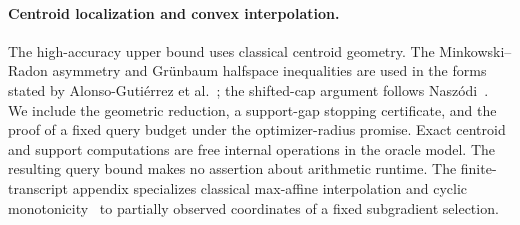 \documentclass[11pt]{article}
\numberwithin{equation}{section}
\theoremstyle{definition}
\theoremstyle{remark}
\begin{document}
\paragraph{Centroid localization and convex interpolation.}
The high-accuracy upper bound uses classical centroid geometry. The Minkowski--Radon asymmetry and Gr\"unbaum halfspace inequalities are used in the forms stated by Alonso-Guti\'errez et al.\ \cite{AGMSMGYN2024}; the shifted-cap argument follows Nasz\'odi\ \cite[Lemma~2.1]{Naszodi2017}. We include the geometric reduction, a support-gap stopping certificate, and the proof of a fixed query budget under the optimizer-radius promise. Exact centroid and support computations are free internal operations in the oracle model. The resulting query bound makes no assertion about arithmetic runtime. The finite-transcript appendix specializes classical max-affine interpolation and cyclic monotonicity\ \cite{Rockafellar1966} to partially observed coordinates of a fixed subgradient selection.
\end{document}
